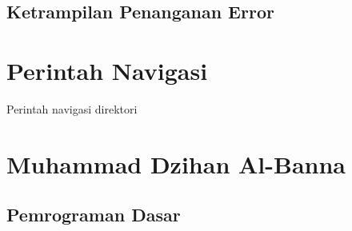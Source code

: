 \subsection{Ketrampilan Penanganan Error}
    

\section{Perintah Navigasi}
Perintah navigasi direktori
\section{Muhammad Dzihan Al-Banna}
\subsection{Pemrograman Dasar}


